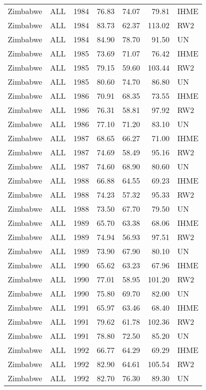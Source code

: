\begin{longtable}{lllrrrl}
  Zimbabwe & ALL & 1984 & 76.83 & 74.07 & 79.81 & IHME \\ 
  Zimbabwe & ALL & 1984 & 83.73 & 62.37 & 113.02 & RW2 \\ 
  Zimbabwe & ALL & 1984 & 84.90 & 78.70 & 91.50 & UN \\ 
  Zimbabwe & ALL & 1985 & 73.69 & 71.07 & 76.42 & IHME \\ 
  Zimbabwe & ALL & 1985 & 79.15 & 59.60 & 103.44 & RW2 \\ 
  Zimbabwe & ALL & 1985 & 80.60 & 74.70 & 86.80 & UN \\ 
  Zimbabwe & ALL & 1986 & 70.91 & 68.35 & 73.55 & IHME \\ 
  Zimbabwe & ALL & 1986 & 76.31 & 58.81 & 97.92 & RW2 \\ 
  Zimbabwe & ALL & 1986 & 77.10 & 71.20 & 83.10 & UN \\ 
  Zimbabwe & ALL & 1987 & 68.65 & 66.27 & 71.00 & IHME \\ 
  Zimbabwe & ALL & 1987 & 74.69 & 58.49 & 95.16 & RW2 \\ 
  Zimbabwe & ALL & 1987 & 74.60 & 68.90 & 80.60 & UN \\ 
  Zimbabwe & ALL & 1988 & 66.88 & 64.55 & 69.23 & IHME \\ 
  Zimbabwe & ALL & 1988 & 74.23 & 57.32 & 95.33 & RW2 \\ 
  Zimbabwe & ALL & 1988 & 73.50 & 67.70 & 79.50 & UN \\ 
  Zimbabwe & ALL & 1989 & 65.70 & 63.38 & 68.06 & IHME \\ 
  Zimbabwe & ALL & 1989 & 74.94 & 56.93 & 97.51 & RW2 \\ 
  Zimbabwe & ALL & 1989 & 73.90 & 67.90 & 80.10 & UN \\ 
  Zimbabwe & ALL & 1990 & 65.62 & 63.23 & 67.96 & IHME \\ 
  Zimbabwe & ALL & 1990 & 77.01 & 58.95 & 101.20 & RW2 \\ 
  Zimbabwe & ALL & 1990 & 75.80 & 69.70 & 82.00 & UN \\ 
  Zimbabwe & ALL & 1991 & 65.97 & 63.46 & 68.40 & IHME \\ 
  Zimbabwe & ALL & 1991 & 79.62 & 61.78 & 102.36 & RW2 \\ 
  Zimbabwe & ALL & 1991 & 78.80 & 72.50 & 85.20 & UN \\ 
  Zimbabwe & ALL & 1992 & 66.77 & 64.29 & 69.29 & IHME \\ 
  Zimbabwe & ALL & 1992 & 82.90 & 64.61 & 105.54 & RW2 \\ 
  Zimbabwe & ALL & 1992 & 82.70 & 76.30 & 89.30 & UN \\ 

\end{longtable}
